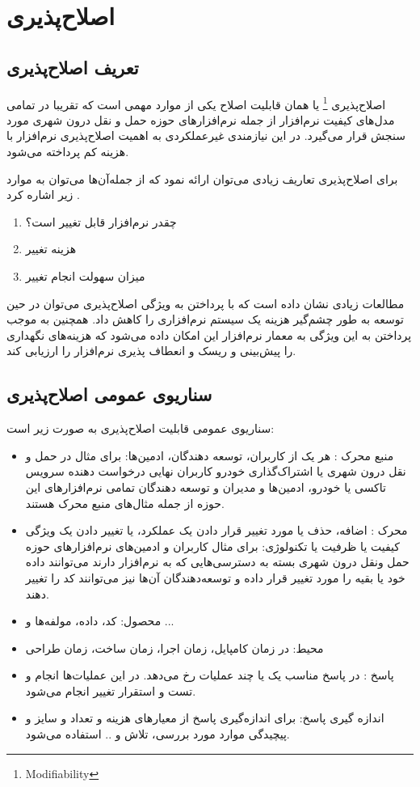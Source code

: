 \chapter{اصلاح‌پذیری}
\section{تعریف اصلاح‌پذیری}
اصلاح‌پذیری
\footnote{Modifiability}
یا همان قابلیت اصلاح یکی از موارد مهمی است که تقریبا در تمامی مدل‌های کیفیت نرم‌افزار از جمله نرم‌افزارهای حوزه حمل و نقل درون شهری مورد سنجش قرار می‌گیرد. در این نیازمندی غیرعملکردی به اهمیت اصلاح‌پذیری نرم‌افزار با هزینه کم پرداخته می‌شود.

برای اصلاح‌پذیری تعاریف زیادی می‌توان ارائه نمود که از جمله‌آن‌ها می‌توان به موارد زیر اشاره کرد \cite{mod:c1-cuibancan-2020}.

\begin{enumerate}
\item
چقدر نرم‌افزار قابل تغییر است؟
\item 
هزینه تغییر 
\item
میزان سهولت انجام تغییر
\end{enumerate}

مطالعات زیادی نشان داده است که با پرداختن به ویژگی اصلاح‌پذیری می‌توان در حین توسعه به طور چشم‌گیر هزینه یک سیستم‌ نرم‌افزاری را کاهش داد.
همچنین به موجب پرداختن به این ویژگی به معمار نرم‌افزار این امکان داده می‌شود که هزینه‌های نگهداری را پیش‌بینی و ریسک و انعطاف پذیری نرم‌افزار را ارزیابی کند.

\section{سناریوی عمومی اصلاح‌پذیری}

سناریو‌ی عمومی قابلیت اصلاح‌پذیری به صورت زیر است:
\begin{itemize}
\item
منبع محرک : هر یک از کاربران، توسعه دهندگان، ادمین‌ها: برای مثال در حمل و نقل درون شهری یا اشتراک‌گذاری خودرو کاربران نهایی درخواست دهنده سرویس تاکسی یا خودرو، ادمین‌ها و مدیران و توسعه دهندگان تمامی نرم‌افزارهای این حوزه از جمله مثال‌های منبع محرک هستند.
\item
محرک : اضافه، حذف یا مورد تغییر قرار دادن یک عملکرد، یا تغییر دادن یک ویژگی کیفیت یا ظرفیت یا تکنولوژی: برای مثال کاربران و ادمین‌های نرم‌افزارهای حوزه حمل ونقل درون شهری بسته به دسترسی‌هایی که به نرم‌افزار دارند می‌توانند داده خود یا بقیه را مورد تغییر قرار داده و توسعه‌دهندگان آن‌ها نیز می‌توانند کد را تغییر دهند.
\item
محصول:  کد، داده، مولفه‌ها و ...
\item
محیط: در زمان کامپایل، زمان اجرا، زمان ساخت، زمان طراحی
\item
پاسخ : در پاسخ مناسب یک یا چند عملیات رخ می‌دهد. 
در این عملیات‌ها انجام و تست و استقرار تغییر انجام می‌شود.
\item
اندازه گیری پاسخ: برای اندازه‌گیری پاسخ از معیار‌‌های هزینه و تعداد و سایز و پیچیدگی موارد مورد بررسی، تلاش و .. استفاده می‌شود.
\end{itemize}

